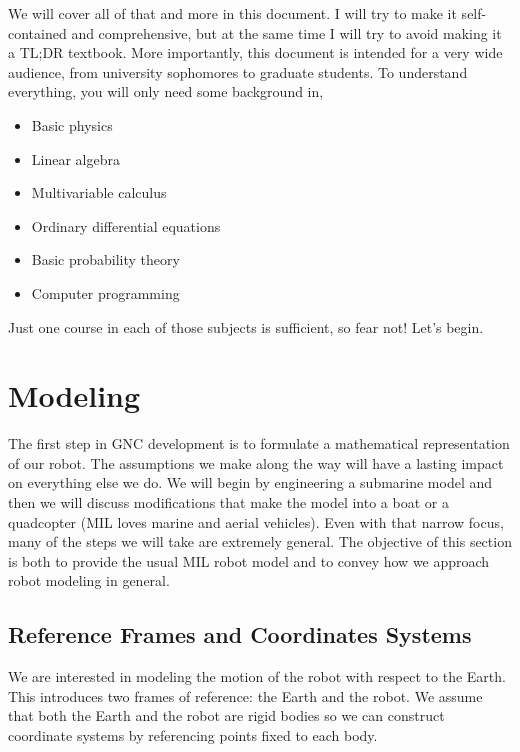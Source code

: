 \documentclass{article}
\begin{document}
We will cover all of that and more in this document. I will try to make it self-contained and comprehensive, but at the same time I will try to avoid making it a TL;DR textbook. More importantly, this document is intended for a very wide audience, from university sophomores to graduate students. To understand everything, you will only need some background in,
\begin{itemize}
  \item Basic physics
  \item Linear algebra
  \item Multivariable calculus
  \item Ordinary differential equations
  \item Basic probability theory
  \item Computer programming
\end{itemize}

Just one course in each of those subjects is sufficient, so fear not! Let's begin.


\clearpage
\tableofcontents



\section{Modeling}

The first step in GNC development is to formulate a mathematical representation of our robot. The assumptions we make along the way will have a lasting impact on everything else we do. We will begin by engineering a submarine model and then we will discuss modifications that make the model into a boat or a quadcopter (MIL loves marine and aerial vehicles). Even with that narrow focus, many of the steps we will take are extremely general. The objective of this section is both to provide the usual MIL robot model and to convey how we approach robot modeling in general.

\subsection{Reference Frames and Coordinates Systems}

We are interested in modeling the motion of the robot with respect to the Earth. This introduces two frames of reference: the Earth and the robot. We assume that both the Earth and the robot are rigid bodies so we can construct coordinate systems by referencing points fixed to each body.\\
\end{document}
